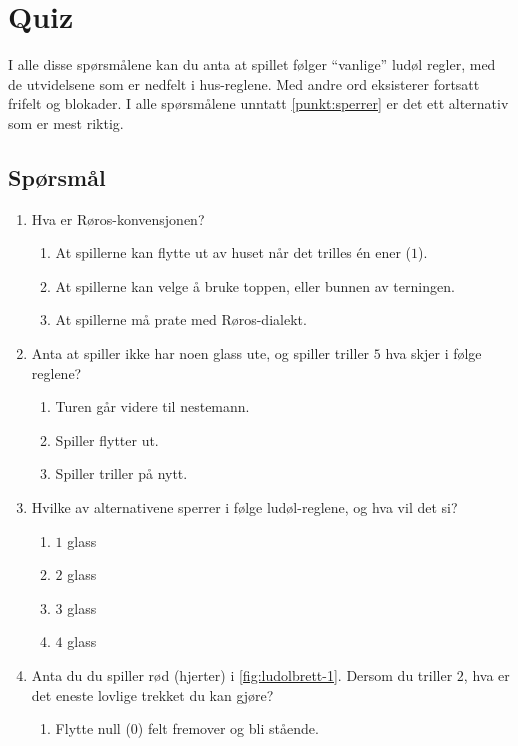\documentclass[10pt,a4paper,norsk,openany]{book}
\begin{document}
\chapter{Quiz}
\label{chap:quiz}
I alle disse spørsmålene kan du anta at spillet følger ``vanlige'' ludøl
regler, med de utvidelsene som er nedfelt i hus-reglene. Med andre ord
eksisterer fortsatt frifelt og blokader. I alle spørsmålene unntatt
\cref{punkt:sperrer} er det ett alternativ som er mest riktig.  

\section{Spørsmål}

\begin{enumerate}
  \item Hva er Røros-konvensjonen? 
    \begin{enumerate}
      \item At spillerne kan flytte ut av huset når det trilles én ener ($1$).
      \item At spillerne kan velge å bruke toppen, eller bunnen av terningen.
      \item At spillerne må prate med Røros-dialekt.
    \end{enumerate}
  \item Anta at spiller ikke har noen glass ute, og spiller triller $5$ hva
    skjer i følge reglene? 
    \begin{enumerate}
    \item Turen går videre til nestemann.
    \item Spiller flytter ut.
    \item Spiller triller på nytt. 
    \end{enumerate}
  \item \label{punkt:sperrer} Hvilke av alternativene sperrer i følge ludøl-reglene, og hva vil
    det si?
    \begin{enumerate}
      \item $1$ glass
      \item $2$ glass
      \item $3$ glass
      \item $4$ glass
    \end{enumerate}
  \item Anta du du spiller rød (hjerter) i \cref{fig:ludolbrett-1}. Dersom du
    triller $2$, hva er det eneste lovlige trekket du kan gjøre?
    \begin{enumerate}
      \item Flytte null ($0$) felt fremover og bli stående.

\end{enumerate}
\end{enumerate}
\end{document}
